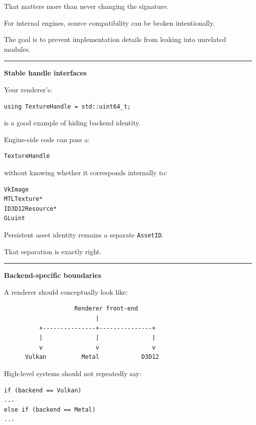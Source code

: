 That matters more than never changing the signature.

For internal engines, source compatibility can be broken intentionally.

The goal is to prevent implementation details from leaking into unrelated modules.

\begin{center}\rule{0.5\linewidth}{0.5pt}\end{center}

\textbf{Stable handle interfaces}

Your renderer's:

\begin{verbatim}
using TextureHandle = std::uint64_t;
\end{verbatim}

is a good example of hiding backend identity.

Engine-side code can pass a:

\begin{verbatim}
TextureHandle
\end{verbatim}

without knowing whether it corresponds internally to:

\begin{verbatim}
VkImage
MTLTexture*
ID3D12Resource*
GLuint
\end{verbatim}

Persistent asset identity remains a separate \texttt{AssetID}.

That separation is exactly right.

\begin{center}\rule{0.5\linewidth}{0.5pt}\end{center}

\textbf{Backend-specific boundaries}

A renderer should conceptually look like:

\begin{verbatim}
                    Renderer front-end
                          |
          +---------------+---------------+
          |               |               |
          v               v               v
      Vulkan          Metal            D3D12
\end{verbatim}

High-level systems should not repeatedly say:

\begin{verbatim}
if (backend == Vulkan)
...
else if (backend == Metal)
...
\end{verbatim}

